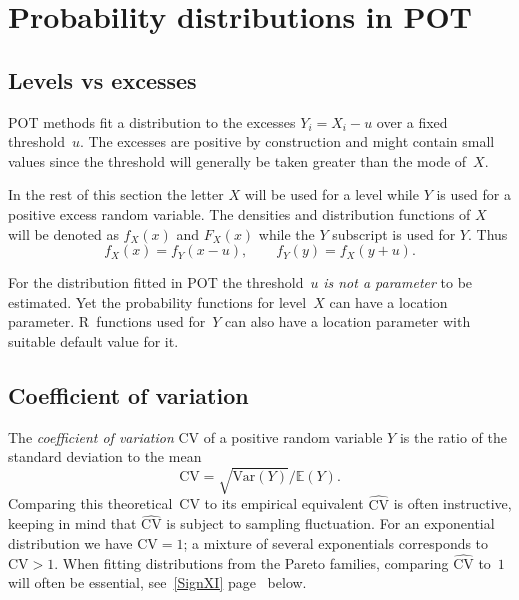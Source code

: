 \documentclass[a4paper]{report}
\newcommand{\Esp}{\mathbb{E}}
\newcommand{\Var}{\textrm{Var}}
\begin{document}


\section{Probability distributions in POT}

\subsection{Levels vs excesses} 
POT methods fit a distribution to the excesses 
$Y_i=X_i-u$ over a fixed threshold~$u$. The excesses are positive by construction 
and  might contain small values since the threshold will generally be
taken greater than the mode of~$X$.

In the rest of this section the letter $X$ will be used for a level while $Y$ 
is used for a positive excess random variable. The densities and 
distribution functions of $X$ will be denoted as $f_X(x)$ and $F_X(x)$ while 
the $Y$ subscript is used for $Y$. Thus 
$$
    f_X(x) = f_Y(x-u), \qquad f_Y(y) = f_X(y+u).
$$


For the distribution fitted in POT the threshold~$u$
\textit{is not a parameter} to be estimated.  Yet the probability
functions for level~$X$ can have a location  parameter. 
R~functions used for~$Y$ can also have a location parameter with  
suitable default value for it. 


\subsection{Coefficient of variation}
The \textit{coefficient of variation} 
CV of a positive random variable $Y$ is the ratio of the 
standard deviation  to the mean
\begin{equation}
  \label{eq:CVTHEO}
  \mathrm{CV} = \sqrt{\Var(Y)}/\Esp(Y).
\end{equation}
Comparing this theoretical~CV to its empirical equivalent
$\widehat{\mathrm{CV}}$ is often instructive, keeping in mind that
$\widehat{\mathrm{CV}}$ is subject to sampling fluctuation.  For an exponential
distribution we have $\textrm{CV}=1$; a mixture of several exponentials
corresponds to $\textrm{CV}>1$. When fitting distributions from the Pareto
families, comparing $\widehat{\mathrm{CV}}$ to~$1$ will often be essential,
see~\ref{SignXI} page~\pageref{SignXI} below.
\end{document}

